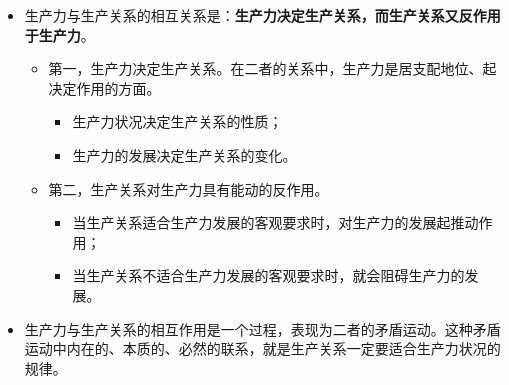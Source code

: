 \documentclass[12pt,openany]{ctexbook}
\begin{document}
\begin{itemize}
\begin{itemize}
  \item 生产力与生产关系的相互关系是：\textbf{生产力决定生产关系，而生产关系又反作用于生产力}。
\begin{itemize}
  \item 第一，生产力决定生产关系。在二者的关系中，生产力是居支配地位、起决定作用的方面。
\begin{itemize}
  \item 生产力状况决定生产关系的性质；
  \item 生产力的发展决定生产关系的变化。
\end{itemize}
  \item 第二，生产关系对生产力具有能动的反作用。
\begin{itemize}
  \item 当生产关系适合生产力发展的客观要求时，对生产力的发展起推动作用；
  \item 当生产关系不适合生产力发展的客观要求时，就会阻碍生产力的发展。
\end{itemize}
\end{itemize}
  \item 生产力与生产关系的相互作用是一个过程，表现为二者的矛盾运动。这种矛盾运动中内在的、本质的、必然的联系，就是生产关系一定要适合生产力状况的规律。
\end{itemize}
\end{itemize}
\end{document}
